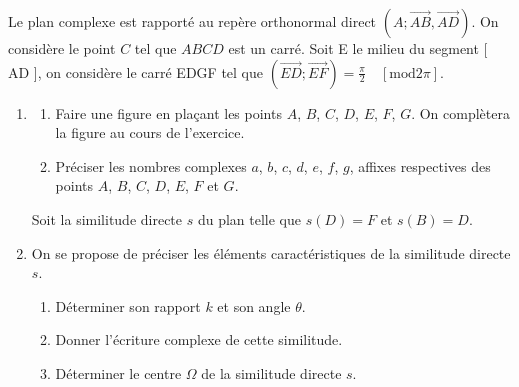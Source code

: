 \begin{exo}
      Le plan complexe est rapporté au repère orthonormal direct $( A ; \overrightarrow{AB} , \overrightarrow{AD} )$. 
      On consid\`ere le point $C$ tel que $ABCD$ est un carr\'e.
      Soit E le milieu du segment [ AD ], on considère le carré EDGF tel que
      $( \overrightarrow{ED} ; \overrightarrow{EF} ) = \frac{\pi}{2} \quad [ \mathrm{mod} 2 \pi ] $.
      \begin{enumerate}
            \item \begin{enumerate}
                        \item Faire une figure en plaçant les points 
                              $A$, $B$, $C$, $D$, $E$, $F$, $G$. 
                              On complètera la figure au cours de l’exercice.
                        \item Préciser les nombres complexes $a$, $b$, $c$, $d$, $e$, $f$, $g$, 
                              affixes respectives des points $A$, $B$, $C$, $D$, $E$, $F$ et $G$. 
                  \end{enumerate}
                  Soit la similitude directe $s$ du plan telle que $s ( D ) = F$ et $s ( B ) = D$.
            \item On se propose de préciser les éléments caractéristiques de la similitude directe $s$.
                  \begin{enumerate}
                        \item Déterminer son rapport $k$ et son angle $\theta$.
                        \item Donner l’écriture complexe de cette similitude.
                        \item Déterminer le centre $\Omega$ de la similitude directe $s$.
                  \end{enumerate}
      \end{enumerate}
\end{exo}
%
